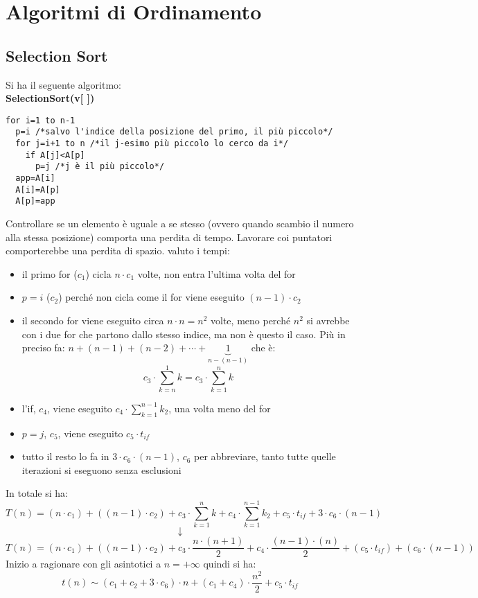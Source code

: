 \documentclass[a4paper,12pt,oneside,tikz]{book}
\begin{document}
\section{Algoritmi di Ordinamento}
\subsection{Selection Sort}
Si ha il seguente algoritmo:\\
\textbf{SelectionSort(v[ ])}
\begin{verbatim}
for i=1 to n-1 
  p=i /*salvo l'indice della posizione del primo, il più piccolo*/
  for j=i+1 to n /*il j-esimo più piccolo lo cerco da i*/
    if A[j]<A[p]
      p=j /*j è il più piccolo*/
  app=A[i]
  A[i]=A[p]
  A[p]=app
\end{verbatim}
Controllare se un elemento è uguale a se stesso (ovvero quando scambio il numero alla stessa posizione) comporta una perdita di tempo. Lavorare coi puntatori comporterebbe una perdita di spazio.
valuto i tempi:
\begin{itemize}
	\item il primo for ($c_1$) cicla $n\cdot c_1$ volte, non entra l'ultima volta del for
	\item $p=i$ ($c_2$) perché non cicla come il for viene eseguito $(n-1)\cdot c_2$
	\item il secondo for viene eseguito circa $n\cdot n=n^2$ volte, meno perché $n^2$ si avrebbe con i due for che partono dallo stesso indice, ma non è questo il caso. Più in preciso fa: $n+(n-1)+(n-2)+\cdots+\underbrace{1}_{n-(n-1)}$ che è:
	      $$c_3\cdot\sum_{k=n}^1 k=c_3\cdot\sum_{k=1}^n k $$
	\item l'if, $c_4$, viene eseguito $c_4\cdot\sum_{k=1}^{n-1} k_2$, una volta meno del for
	\item $p=j$, $c_5$, viene eseguito $c_5\cdot t_{if}$
	\item tutto il resto lo fa in $3\cdot c_6\cdot(n-1)$, $c_6$ per abbreviare, tanto tutte quelle iterazioni si eseguono senza esclusioni
\end{itemize}

In totale si ha: $$T(n)=(n\cdot c_1)+((n-1)\cdot c_2)+c_3\cdot\sum_{k=1}^n k+c_4\cdot\sum_{k=1}^{n-1} k_2+c_5\cdot t_{if}+3\cdot c_6\cdot(n-1)$$
$$\downarrow$$
$$T(n)=(n\cdot c_1)+((n-1)\cdot c_2)+c_3\cdot\frac{n\cdot(n+1)}{2}+c_4\cdot\frac{(n-1) \cdot(n)}{2}+(c_5\cdot t_{if})+(c_6\cdot(n-1))$$
Inizio a ragionare con gli asintotici a $n=+\infty$ quindi si ha:
$$t(n)\sim (c_1+c_2+3\cdot c_6)\cdot n+(c_1+c_4)\cdot\frac{n^2}{2}+c_5\cdot t_{if}$$
\end{document}
